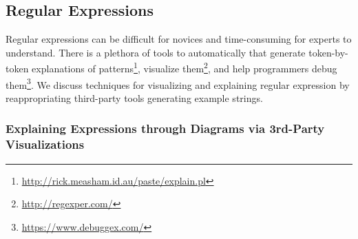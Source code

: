 \begin{figure}
\end{figure}

\subsection{Regular Expressions}

\begin{changes}
Regular expressions can be difficult for novices and time-consuming for experts to understand.
There is a plethora of tools to automatically that generate token-by-token explanations of patterns\footnote{\url{http://rick.measham.id.au/paste/explain.pl}}, visualize them\footnote{\url{http://regexper.com/}}, and help programmers debug them\footnote{\url{https://www.debuggex.com/}}.
We discuss techniques for visualizing and explaining regular expression by reappropriating third-party tools generating example strings.
\end{changes}

\subsubsection{Explaining Expressions through Diagrams via 3rd-Party Visualizations}

